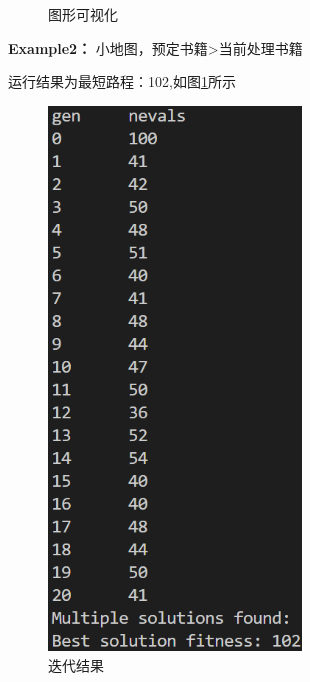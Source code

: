 \documentclass[withoutpreface,bwprint]{thesis-config}
\begin{document}
\begin{figure}[!htbp]
\begin{minipage}[b]{0.7\linewidth}
            \caption{图形可视化}
        \end{minipage}%
    \end{figure}
\par \textbf{Example2：} 小地图，预定书籍>当前处理书籍
\par 运行结果为最短路程：102,如图\ref{dd}所示
    \begin{figure}[!htbp]
        \centering
        \begin{minipage}[b]{0.3\linewidth}
            \centering
            \includegraphics[width=0.6\textwidth]{figures/3.2.png}
            \caption{迭代结果}
            \label{dd}
        \end{minipage}%
        \begin{minipage}[b]{0.7\linewidth}
            \centering

\end{minipage}
\end{figure}
\end{document}
